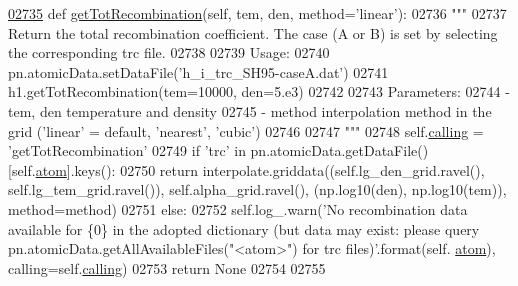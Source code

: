 \begin{DoxyCode}
\hypertarget{classpyneb_1_1core_1_1pynebcore_1_1_rec_atom_l02735}{}\hyperlink{classpyneb_1_1core_1_1pynebcore_1_1_rec_atom_ab7e0b11cdc85dade76528fe5de9886c0}{02735}     \textcolor{keyword}{def }\hyperlink{classpyneb_1_1core_1_1pynebcore_1_1_rec_atom_ab7e0b11cdc85dade76528fe5de9886c0}{getTotRecombination}(self, tem, den, method='linear'):
02736         \textcolor{stringliteral}{"""}
02737 \textcolor{stringliteral}{        Return the total recombination coefficient. The case (A or B) is set by selecting the corresponding
       trc file.}
02738 \textcolor{stringliteral}{        }
02739 \textcolor{stringliteral}{        Usage:}
02740 \textcolor{stringliteral}{            pn.atomicData.setDataFile('h\_i\_trc\_SH95-caseA.dat')}
02741 \textcolor{stringliteral}{            h1.getTotRecombination(tem=10000, den=5.e3)}
02742 \textcolor{stringliteral}{            }
02743 \textcolor{stringliteral}{        Parameters:}
02744 \textcolor{stringliteral}{            - tem, den  temperature and density}
02745 \textcolor{stringliteral}{            - method    interpolation method in the grid ('linear' = default, 'nearest', 'cubic')    }
02746 \textcolor{stringliteral}{                }
02747 \textcolor{stringliteral}{        """} 
02748         self.\hyperlink{classpyneb_1_1core_1_1pynebcore_1_1_rec_atom_a82ec425ebba32b73a5d9ae52717d47c4}{calling} = \textcolor{stringliteral}{'getTotRecombination'}
02749         \textcolor{keywordflow}{if} \textcolor{stringliteral}{'trc'} \textcolor{keywordflow}{in} pn.atomicData.getDataFile()[self.\hyperlink{classpyneb_1_1core_1_1pynebcore_1_1_rec_atom_a1a2aa175da6b5b8847f409e37437e3d3}{atom}].keys():
02750             \textcolor{keywordflow}{return} interpolate.griddata((self.lg\_den\_grid.ravel(), self.lg\_tem\_grid.ravel()), 
      self.alpha\_grid.ravel(), (np.log10(den), np.log10(tem)), method=method)
02751         \textcolor{keywordflow}{else}:
02752             self.log\_.warn(\textcolor{stringliteral}{'No recombination data available for \{0\} in the adopted dictionary (but data may
       exist: please query pn.atomicData.getAllAvailableFiles("<atom>") for trc files)'}.format(self.
      \hyperlink{classpyneb_1_1core_1_1pynebcore_1_1_rec_atom_a1a2aa175da6b5b8847f409e37437e3d3}{atom}), calling=self.\hyperlink{classpyneb_1_1core_1_1pynebcore_1_1_rec_atom_a82ec425ebba32b73a5d9ae52717d47c4}{calling})
02753             \textcolor{keywordflow}{return} \textcolor{keywordtype}{None}
02754         
02755         
\end{DoxyCode}
\hypertarget{classpyneb_1_1core_1_1pynebcore_1_1_rec_atom_abc77497db8e5d888d8424e4a82d50c2e}{}
